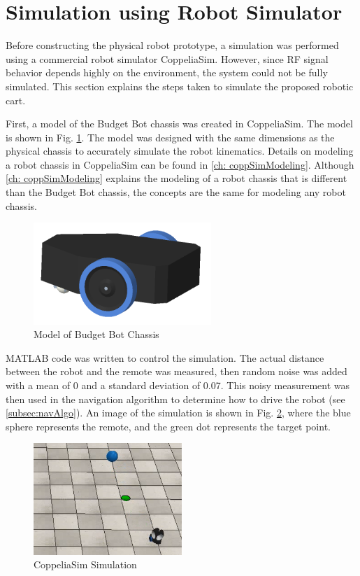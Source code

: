 \section{Simulation using Robot Simulator}

Before constructing the physical robot prototype, a simulation was performed using a commercial robot simulator CoppeliaSim. However, since RF signal behavior depends highly on the environment, the system could not be fully simulated. This section explains the steps taken to simulate the proposed robotic cart.

\vspace*{12pt}
\noindent
First, a model of the Budget Bot chassis was created in CoppeliaSim. The model is shown in Fig. \ref{fig:budgetBotModel}. The model was designed with the same dimensions as the physical chassis to accurately simulate the robot kinematics. Details on modeling a robot chassis in CoppeliaSim can be found in \autoref{ch: coppSimModeling}. Although \autoref{ch: coppSimModeling} explains the modeling of a robot chassis that is different than the Budget Bot chassis, the concepts are the same for modeling any robot chassis.

\begin{figure}
    \centering
    \includegraphics[width=0.6\textwidth]{figs/img/budgetBotModel.png}
    \caption{Model of Budget Bot Chassis}
    \label{fig:budgetBotModel}
\end{figure}

\vspace*{12pt}
\noindent
MATLAB code was written to control the simulation. The actual distance between the robot and the remote was measured, then random noise was added with a mean of 0 and a standard deviation of 0.07. This noisy measurement was then used in the navigation algorithm to determine how to drive the robot (see \autoref{subsec:navAlgo}). An image of the simulation is shown in Fig. \ref{fig:coppSimExample}, where the blue sphere represents the remote, and the green dot represents the target point.
\begin{figure}
    \centering
    \includegraphics[width=0.5\textwidth]{figs/img/coppSimExample.png}
    \caption{CoppeliaSim Simulation}
    \label{fig:coppSimExample}
\end{figure}


